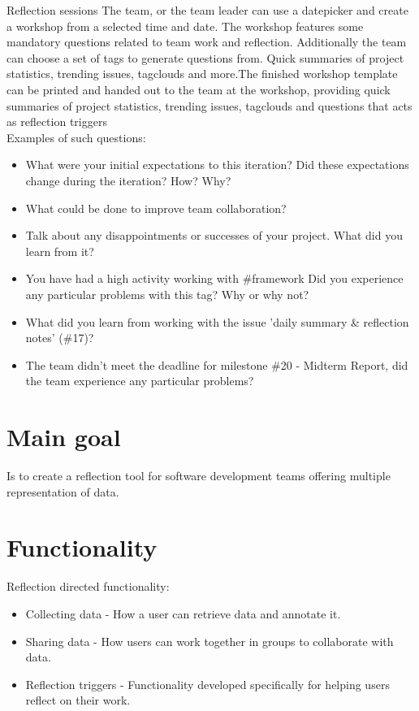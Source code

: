 \begin{description}
	\item {Reflection sessions} 
	The team, or the team leader can use a datepicker and create a workshop from a selected time and date. The workshop features some mandatory questions
	related to team work and reflection. Additionally the team can choose a set of tags to generate questions from. Quick summaries of project statistics, trending issues, tagclouds and more.The finished workshop template can be printed and
	handed out to the team at the workshop, providing quick summaries of project statistics, trending issues, tagclouds and questions that acts as reflection triggers\\
	Examples of such questions: 
		\begin{itemize}
			\item What were your initial expectations to this iteration? Did these expectations change during the iteration? How? Why?
			\item What could be done to improve team collaboration?
			\item Talk about any disappointments or successes of your project. What did you learn from it?
			\item You have had a high activity working with \#framework Did you experience any particular problems with this tag? Why or why not?
			\item What did you learn from working with the issue 'daily summary \& reflection notes' (\#17)?
			\item The team didn't meet the deadline for milestone \#20 - Midterm Report, did the team experience any particular problems?
		\end{itemize}
\end{description}

\section{Main goal}
Is to create a reflection tool for software development teams offering multiple representation of data. %

\section{Functionality}

Reflection directed functionality:
\begin{itemize}
\item Collecting data - How a user can retrieve data and annotate it. 
\item Sharing data - How users can work together in groups to collaborate with data. 
\item Reflection triggers - Functionality developed specifically for helping users reflect on their work.
\end{itemize}

